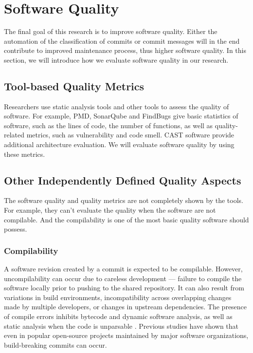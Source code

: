 \section{Software Quality}
\label{sec:quality}

The final goal of this research is to improve software quality.
Either the automation of the classification of commits or commit messages will in the end contribute to improved maintenance process, thus higher software quality.
In this section, we will introduce how we evaluate software quality in our research.

\subsection{Tool-based Quality Metrics}
Researchers use static analysis tools and other tools to assess the quality of software. 
For example, PMD, SonarQube and FindBugs give basic statistics of software, such as the lines of code, the number of functions, as well as quality-related metrics, such as vulnerability and code smell.
CAST software provide additional architecture evaluation.
We will evaluate software quality by using these metrics.

\subsection{Other Independently Defined Quality Aspects}
The software quality and quality metrics are not completely shown by the tools.
For example, they can't evaluate the quality when the software are not compilable. 
And the compilability is one of the most basic quality software should possess.

\subsubsection{Compilability}

A software revision created by a commit is expected to be compilable. However, uncompilability can occur due to careless development --- failure to compile the software locally prior to pushing to the shared repository. It can also result from variations in build environments, incompatibility across overlapping changes made by multiple developers, or changes in upstream dependencies. 
The presence of compile errors inhibits bytecode and dynamic software analysis, as well as static analysis when the code is unparsable \cite{pooyan_esem}.
Previous studies \cite{pooyan_esem, 8170083, Hassan2017ESEM, SMR:SMR1838} have shown that even in popular open-source projects maintained by major software organizations, build-breaking commits can occur.

